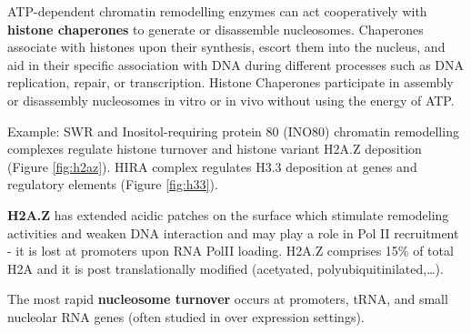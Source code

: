 ATP-dependent chromatin remodelling enzymes can act cooperatively with \textbf{histone chaperones} to generate or disassemble nucleosomes. Chaperones associate with histones upon their synthesis, escort them into the nucleus, and aid in their specific association with DNA during different processes such as DNA replication, repair, or transcription. Histone Chaperones participate in assembly or disassembly nucleosomes in vitro or in vivo without using the energy of ATP.

Example: SWR and Inositol-requiring protein 80 (INO80) chromatin remodelling complexes regulate histone turnover and histone variant H2A.Z deposition (Figure \ref{fig:h2az}). HIRA complex regulates H3.3 deposition at genes and regulatory elements (Figure \ref{fig:h33}).

\textbf{H2A.Z} has extended acidic patches on the surface which stimulate remodeling activities and weaken DNA interaction and may play a role in Pol II recruitment - it is lost at promoters upon RNA PolII loading. H2A.Z comprises 15\% of total H2A and it is post translationally modified (acetyated, polyubiquitinilated,\ldots).

The most rapid \textbf{nucleosome turnover} occurs at promoters, tRNA, and small nucleolar RNA genes (often studied in over expression settings).

